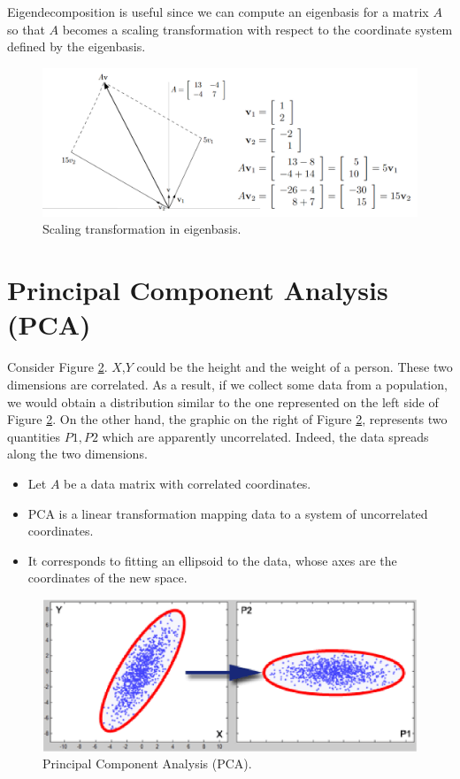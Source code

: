 Eigendecomposition is useful since we can compute an eigenbasis for a matrix $A$ so that $A$ becomes a scaling transformation with respect to the coordinate system defined by the eigenbasis.

\begin{figure}
    \centering
    \includegraphics[width=\textwidth]{images/eigenTrans.png}
    \caption{Scaling transformation in eigenbasis.}
    \label{fig:eigenbasis_trans}
\end{figure}

\section{Principal Component Analysis (PCA)}
Consider Figure \ref{fig:eigen_PCA}. $X$,$Y$ could be the height and the weight of a person. These two dimensions are correlated. As a result, if we collect some data from a population, we would obtain a distribution similar to the one represented on the left side of Figure \ref{fig:eigen_PCA}. On the other hand, the graphic on the right of Figure \ref{fig:eigen_PCA}, represents two quantities $P1, P2$ which are apparently uncorrelated. Indeed, the data spreads along the two dimensions.

\begin{itemize}
    \item Let $A$ be a data matrix with correlated coordinates.
    \item PCA is a linear transformation mapping data to a system of uncorrelated coordinates.
    \item It corresponds to fitting an ellipsoid to the data, whose axes are the coordinates of the new space.
\end{itemize}

\begin{figure}
    \centering
    \includegraphics[width=\textwidth]{images/pca_eigen.png}
    \caption{Principal Component Analysis (PCA).}
    \label{fig:eigen_PCA}
\end{figure}

